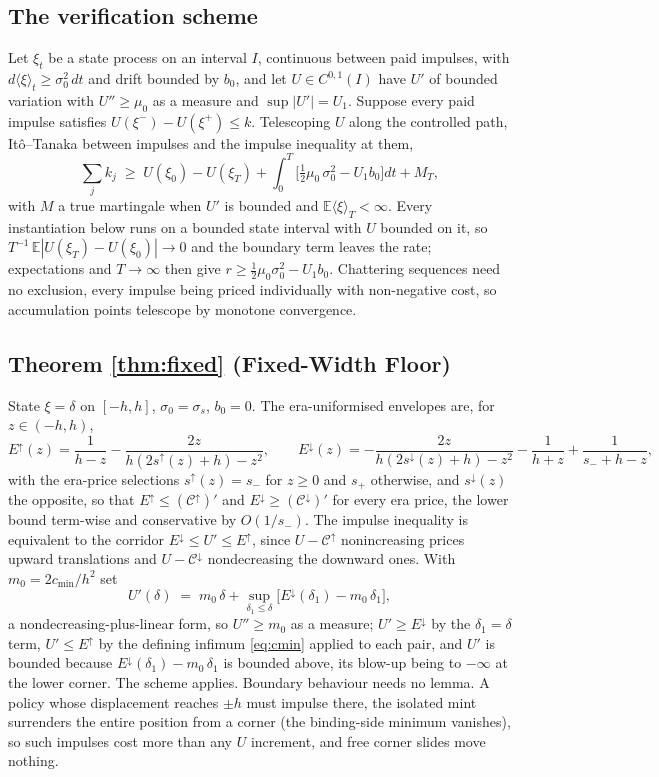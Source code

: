 \documentclass[11pt,a4paper]{article}
\theoremstyle{definition}
\theoremstyle{plain}
\theoremstyle{remark}
\begin{document}
\subsection{The verification scheme}

Let $\xi_t$ be a state process on an interval $I$, continuous between paid impulses, with $d\langle \xi \rangle_t \ge \sigma_0^2
\, dt$ and drift bounded by $b_0$, and let $U \in C^{0,1}(I)$ have $U'$ of bounded variation with $U'' \ge \mu_0$ as a measure and $\sup |U'| = U_1$. Suppose every paid impulse satisfies $U(\xi^-) -
U(\xi^+) \le k$. Telescoping $U$ along the controlled path, It\^o--Tanaka between impulses and the impulse inequality at them,
\[
\sum_j k_j \;\ge\; U(\xi_0) - U(\xi_T) + \int_0^T \Big[
\tfrac12 \mu_0\, \sigma_0^2 - U_1 b_0 \Big] dt + M_T,
\]
with $M$ a true martingale when $U'$ is bounded and $\mathbb{E}\langle \xi \rangle_T < \infty$. Every instantiation below runs on a bounded state interval with $U$ bounded on it, so
$T^{-1}\,\mathbb{E}|U(\xi_T) - U(\xi_0)| \to 0$ and the boundary term leaves the rate; expectations and $T \to
\infty$ then give $r \ge \tfrac12 \mu_0 \sigma_0^2 - U_1 b_0$.
Chattering sequences need no exclusion, every impulse being priced individually with non-negative cost, so accumulation points telescope by monotone convergence.

\subsection{Theorem \ref{thm:fixed} (Fixed-Width Floor)}

State $\xi = \delta$ on $[-h, h]$, $\sigma_0 = \sigma_s$, $b_0 = 0$. The era-uniformised envelopes are, for $z \in (-h, h)$,
\[
E^{\uparrow}(z) = \frac{1}{h - z} -
\frac{2z}{h(2s^{\uparrow}(z) + h) - z^2}, \qquad
E^{\downarrow}(z) = -\frac{2z}{h(2s^{\downarrow}(z) + h)
- z^2} - \frac{1}{h + z} + \frac{1}{s_- + h - z},
\]
with the era-price selections $s^{\uparrow}(z) = s_-$ for $z \ge 0$ and $s_+$ otherwise, and $s^{\downarrow}(z)$ the opposite, so that $E^{\uparrow} \le
(\mathcal{C}^{\uparrow})'$ and $E^{\downarrow}
\ge (\mathcal{C}^{\downarrow})'$ for every era price, the lower bound term-wise and conservative by $O(1/s_-)$. The impulse inequality is equivalent to the corridor
$E^{\downarrow} \le U' \le
E^{\uparrow}$, since $U -
\mathcal{C}^{\uparrow}$ nonincreasing prices upward translations and $U - \mathcal{C}^{\downarrow}$ nondecreasing the downward ones. With $m_0 = 2 c_{\min}/h^2$ set
\[
U'(\delta) \;=\; m_0\,\delta + \sup_{\delta_1 \le \delta}
\big[ E^{\downarrow}(\delta_1) - m_0\,\delta_1
\big],
\]
a nondecreasing-plus-linear form, so $U'' \ge m_0$ as a measure;
$U' \ge E^{\downarrow}$ by the $\delta_1 = \delta$ term, $U' \le E^{\uparrow}$ by the defining infimum \eqref{eq:cmin} applied to each pair, and $U'$ is bounded 
because $E^{\downarrow}(\delta_1) - m_0\,\delta_1$ is bounded above, its blow-up being to $-\infty$ at the lower corner. The scheme applies. Boundary behaviour needs no
lemma. A policy whose displacement reaches $\pm h$ must impulse there, the isolated mint surrenders the entire position from a corner (the binding-side minimum vanishes), so such impulses cost
more than any $U$ increment, and free corner slides move nothing.
\end{document}
